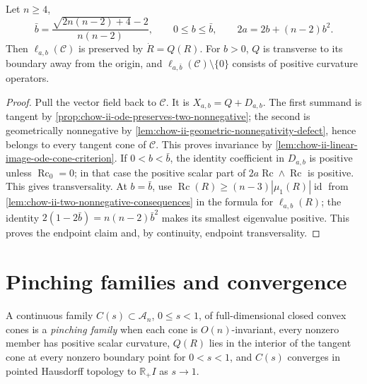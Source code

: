 \begin{proposition}
  \label{prop:chow-ii-preserved-stretched-two-nonnegative-cones}
  Let \(n\ge4\),
  \[
  \bar b=\frac{\sqrt{2n(n-2)+4}-2}{n(n-2)},\qquad
  0\le b\le\bar b,\qquad 2a=2b+(n-2)b^2.
  \]
  Then \(\ell_{a,b}(\mathcal C)\) is preserved by \(\dot R=Q(R)\).  For
  \(b>0\), \(Q\) is transverse to its boundary away from the origin, and
  \(\ell_{a,\bar b}(\mathcal C)\setminus\{0\}\) consists of positive
  curvature operators.
\end{proposition}
\begin{proof}
  Pull the vector field back to \(\mathcal C\).  It is
  \(X_{a,b}=Q+D_{a,b}\).  The first summand is tangent by
  \ref{prop:chow-ii-ode-preserves-two-nonnegative}; the second is
  geometrically nonnegative by
  \ref{lem:chow-ii-geometric-nonnegativity-defect}, hence belongs to every
  tangent cone of \(\mathcal C\).  This proves invariance by
  \ref{lem:chow-ii-linear-image-ode-cone-criterion}.  If \(0<b<\bar b\),
  the identity coefficient in \(D_{a,b}\) is positive unless
  \(\operatorname{Rc}_0=0\); in that case the positive scalar part of
  \(2a\operatorname{Rc}\wedge\operatorname{Rc}\) is positive.  This gives
  transversality.  At \(b=\bar b\), use
  \(\operatorname{Rc}(R)\ge(n-3)|\mu_1(R)|\operatorname{id}\) from
  \ref{lem:chow-ii-two-nonnegative-consequences} in the formula for
  \(\ell_{a,b}(R)\); the identity
  \(2(1-2\bar b)=n(n-2)\bar b^2\) makes its smallest eigenvalue positive.
  This proves the endpoint claim and, by continuity, endpoint transversality.
\end{proof}

\section{Pinching families and convergence}

\begin{definition}
  \label{def:chow-ii-pinching-family}
  A continuous family \(C(s)\subset\mathcal A_n\), \(0\le s<1\), of
  full-dimensional closed convex cones is a \emph{pinching family} when each
  cone is \(O(n)\)-invariant, every nonzero member has positive scalar
  curvature, \(Q(R)\) lies in the interior of the tangent cone at every
  nonzero boundary point for \(0<s<1\), and \(C(s)\) converges in pointed
  Hausdorff topology to \(\mathbb R_+I\) as \(s\to1\).
\end{definition}

